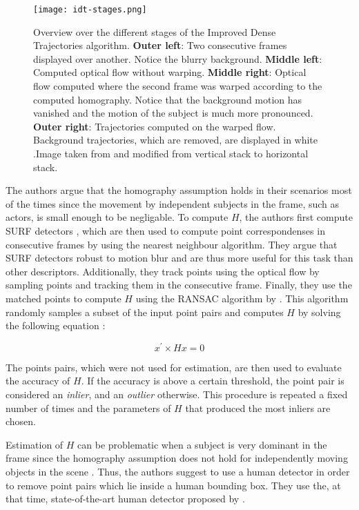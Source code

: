 \begin{figure}[htb!]
    \centering
    \texttt{[image: idt-stages.png]}
    \caption{Overview over the different stages of the Improved Dense Trajectories algorithm. \textbf{Outer left}: Two consecutive frames displayed over another. Notice the blurry background. \textbf{Middle left}: Computed optical flow without warping. \textbf{Middle right}: Optical flow computed where the second frame was warped according to the computed homography. Notice that the background motion has vanished and the motion of the subject is much more pronounced. \textbf{Outer right}: Trajectories computed on the warped flow. Background trajectories, which are removed, are displayed in white .Image taken from \cite{wang_action_2013} and modified from vertical stack to horizontal stack. }
    \label{fig:idt-stages}
\end{figure}

The authors argue that the homography assumption holds in their scenarios most of the times since the movement by independent subjects in the frame, such as actors, is small enough to be negligable.
To compute $H$, the authors first compute SURF detectors \cite{bay_surf:_2006}, which are then used to compute point correspondenses in consecutive frames by using the nearest neighbour algorithm.
They argue that SURF detectors robust to motion blur and are thus more useful for this task than other descriptors.
Additionally, they track points using the optical flow by sampling points and tracking them in the consecutive frame.
Finally, they use the matched points to compute $H$ using the RANSAC algorithm by \cite{fischler_random_1981}.
This algorithm randomly samples a subset of the input point pairs and computes $H$ by solving the following equation \cite{vincent_detecting_2001}:

\begin{equation}
    x^\prime \times Hx = 0 
\end{equation}

The points pairs, which were not used for estimation, are then used to evaluate the accuracy of $H$.
If the accuracy is above a certain threshold, the point pair is considered an \textit{inlier}, and an \textit{outlier} otherwise.
This procedure is repeated a fixed number of times and the parameters of $H$ that produced the most inliers are chosen. 

Estimation of $H$ can be problematic when a subject is very dominant in the frame since the homography assumption does not hold for independently moving objects in the scene \cite{wang_action_2013}.
Thus, the authors suggest to use a human detector in order to remove point pairs which lie inside a human bounding box.
They use the, at that time, state-of-the-art human detector proposed by \cite{prest_weakly_2012}.

